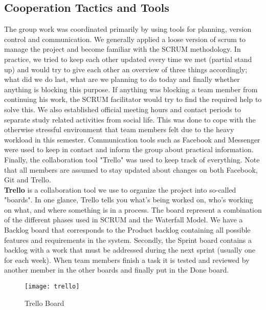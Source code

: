 \subsection{Cooperation Tactics and Tools}
The group work was coordinated primarily by using tools for planning, version control and communication. We generally applied a loose version of scrum to manage the project and become familiar with the SCRUM methodology. In practice, we tried to keep each other updated every time we met (partial stand up) and would try to give each other an overview of three things accordingly; what did we do last, what are we planning to do today and finally whether anything is blocking this purpose. If anything was blocking a team member from continuing his work, the SCRUM facilitator would try to find the required help to solve this. 
We also established official meeting hours and contact periods to separate study related activities from social life. This was done to cope with the otherwise stressful environment that team members felt due to the heavy workload in this semester. Communication tools such as Facebook and Messenger were used to keep in contact and inform the group about practical information. Finally, the collaboration tool "Trello"  was used to keep track of everything. Note that all members are assumed to stay updated about changes on both Facebook, Git and Trello. 
\\
\textbf{Trello} is a collaboration tool we use to organize the project into so-called "boards". In one glance, Trello tells you what's being worked on, who's working on what, and where something is in a process. The board represent a combination of the different phases used in SCRUM and the Waterfall Model. We have a Backlog board that corresponds to the Product backlog containing all possible features and requirements in the system. Secondly, the Sprint board contains a backlog with a work that must be addressed during the next sprint (usually one for each week). When team members finish a task it is tested and reviewed by another member in the other boards and finally put in the Done board. 

\begin{figure}[H]
	\texttt{[image: trello]}
	\caption{Trello Board}
	\label{fig:trello}
\end{figure}
